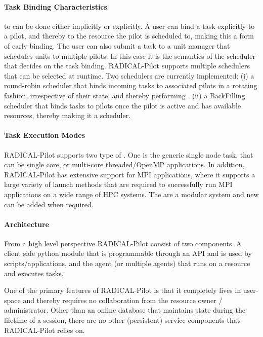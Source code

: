 \documentclass{sig-alternate}
\begin{document}
\paragraph{Task Binding Characteristics}

 to   can be done either implicitly
or explicitly. A user can bind a task explicitly to a pilot, and thereby to the
resource the pilot is scheduled to, making this a form of early binding. The
user can also submit a task to a unit manager that schedules units to multiple
pilots. In this case it is the semantics of the scheduler that decides on the
task binding. RADICAL-Pilot supports multiple schedulers that can be selected
at runtime. Two schedulers are currently implemented: (i) a round-robin
scheduler that binds incoming tasks to associated pilots in a rotating fashion,
irrespective of their state, and thereby performing . (ii)
a BackFilling scheduler that binds tasks to pilots once the pilot is active and
has available resources, thereby making it a  scheduler.

\paragraph{Task Execution Modes}

RADICAL-Pilot supports two type of . One is the generic single
node task, that can be single core, or multi-core threaded/OpenMP applications.
In addition, RADICAL-Pilot has extensive support for MPI applications, where it
supports a large variety of launch methods that are required to successfully
run MPI applications on a wide range of HPC systems. The  are a modular system and new  can be added
when required.

\paragraph{Architecture}

From a high level perspective RADICAL-Pilot consist of two components. A client
side python module that is programmable through an API and is used by
scripts/applications, and the agent (or multiple agents) that runs on a
resource and executes tasks.

One of the primary features of RADICAL-Pilot is that it completely lives in
user-space and thereby requires no collaboration from the resource owner /
administrator. Other than an online database that maintains state during the
lifetime of a session, there are no other (persistent) service components that
RADICAL-Pilot relies on.
\end{document}

